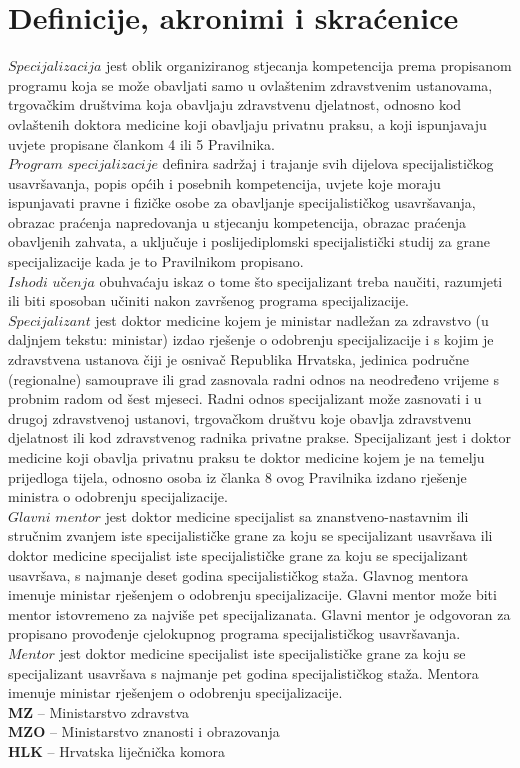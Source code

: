 \documentclass{scrreprt}
\begin{document}
\section{Definicije, akronimi i skraćenice}
$Specijalizacija$ jest oblik organiziranog stjecanja kompetencija prema propisanom programu koja se
može obavljati samo u ovlaštenim zdravstvenim ustanovama, trgovačkim društvima koja obavljaju
zdravstvenu djelatnost, odnosno kod ovlaštenih doktora medicine koji obavljaju privatnu praksu, a koji
ispunjavaju uvjete propisane člankom 4 ili 5 Pravilnika.\\
$Program$ $specijalizacije$ definira sadržaj i trajanje svih dijelova specijalističkog usavršavanja, popis
općih i posebnih kompetencija, uvjete koje moraju ispunjavati pravne i fizičke osobe za obavljanje
specijalističkog usavršavanja, obrazac praćenja napredovanja u stjecanju kompetencija, obrazac
praćenja obavljenih zahvata, a uključuje i poslijediplomski specijalistički studij za grane specijalizacije
kada je to Pravilnikom propisano.\\
$Ishodi$ $u$č$enja$ obuhvaćaju iskaz o tome što specijalizant treba naučiti, razumjeti ili biti sposoban učiniti
nakon završenog programa specijalizacije.\\
$Specijalizant$ jest doktor medicine kojem je ministar nadležan za zdravstvo (u daljnjem tekstu: ministar)
izdao rješenje o odobrenju specijalizacije i s kojim je zdravstvena ustanova čiji je osnivač Republika
Hrvatska, jedinica područne (regionalne) samouprave ili grad zasnovala radni odnos na neodređeno
vrijeme s probnim radom od šest mjeseci. Radni odnos specijalizant može zasnovati i u drugoj
zdravstvenoj ustanovi, trgovačkom društvu koje obavlja zdravstvenu djelatnost ili kod zdravstvenog
radnika privatne prakse. Specijalizant jest i doktor medicine koji obavlja privatnu praksu te doktor
medicine kojem je na temelju prijedloga tijela, odnosno osoba iz članka 8 ovog Pravilnika izdano
rješenje ministra o odobrenju specijalizacije.\\
$Glavni$ $mentor$ jest doktor medicine specijalist sa znanstveno-nastavnim ili stručnim zvanjem iste
specijalističke grane za koju se specijalizant usavršava ili doktor medicine specijalist iste specijalističke
grane za koju se specijalizant usavršava, s najmanje deset godina specijalističkog staža. Glavnog mentora imenuje ministar rješenjem o odobrenju specijalizacije. Glavni mentor može biti mentor istovremeno za najviše pet specijalizanata. Glavni mentor je odgovoran za propisano provođenje cjelokupnog programa specijalističkog usavršavanja.\\
$Mentor$ jest doktor medicine specijalist iste specijalističke grane za koju se specijalizant usavršava s
najmanje pet godina specijalističkog staža. Mentora imenuje ministar rješenjem o odobrenju specijalizacije.\\
\textbf{MZ} – Ministarstvo zdravstva\\
\textbf{MZO} – Ministarstvo znanosti i obrazovanja\\
\textbf{HLK} – Hrvatska liječnička komora
\end{document}
